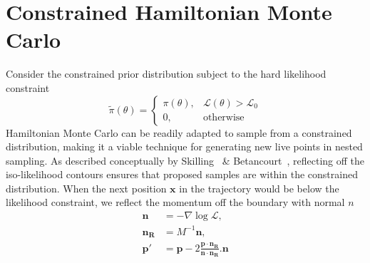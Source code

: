 \documentclass[11pt]{article}
\begin{document}
    \section{Constrained Hamiltonian Monte Carlo}\label{sec:chmc}
    Consider the constrained prior distribution subject to the hard likelihood constraint
    \begin{equation}\label{eq:constrained_prior}
        \tilde{\pi}(\theta) = \begin{cases}
                                  \pi(\theta), & \mathcal{L}(\theta) > \mathcal{L}_0 \\
                                  0, & \text{otherwise}
                              \end{cases}
    \end{equation}
    Hamiltonian Monte Carlo can be readily adapted to sample from a constrained distribution, making it a viable
    technique for generating new live points in nested sampling.
    As described conceptually by Skilling~\cite{GMC} \& Betancourt~\cite{Betancourt_NS_CHMC}, reflecting
    off the iso-likelihood contours ensures that proposed samples are within the constrained distribution.
    When the next position $\mathbf{x}$ in the trajectory would be below the likelihood constraint, we reflect the
    momentum off the boundary with normal $n$
    \begin{equation}\label{eq:reflection}
    \begin{aligned}
        \mathbf{n} &= - \nabla \log{\mathcal{L}}, \\
        \mathbf{n_R} &= M^{-1} \mathbf{n}, \\
        \mathbf{p'} &= \mathbf{p} - 2 \frac{ \mathbf{p} \cdot \mathbf{n_R} }{\mathbf{n} \cdot \mathbf{n_R}}. \mathbf{n}
    \end{aligned}
    \end{equation}
\end{document}
